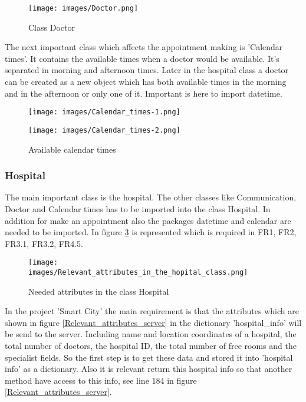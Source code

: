 \begin{figure}[H]
\centering
\sidecaption
\texttt{[image: images/Doctor.png]}
\caption{Class Doctor}
\label{Doctor}
\end{figure}

The next important class which affects the appointment making is 'Calendar times'. It contains the available times when a doctor would be available. It's separated in morning and afternoon times. Later in the hospital class a doctor can be created as a new object which has both available times in the morning and in the afternoon or only one of it. Important is here to import datetime.


\begin{figure}[t]
\begin{minipage}[t]{0.475\textwidth}
\centering
\texttt{[image: images/Calendar\_times-1.png]}
    \caption{Available calendar times}
    \label{Calendar_times}
\end{minipage}
\hfill
\begin{minipage}[t]{0.475\textwidth}
\centering
\texttt{[image: images/Calendar\_times-2.png]}
    \label{2}
\end{minipage}
\end{figure}

\subsubsection{Hospital}
The main important class is the hospital. The other classes like Communication, Doctor and Calendar times has to be imported into the class Hospital. In addition for make an appointment also the packages datetime and calendar are needed to be imported. In figure \ref{hospital_attributes} is represented which is required in FR1, FR2, FR3.1, FR3.2, FR4.5.

\begin{figure}[H]
\centering
\sidecaption
\texttt{[image: images/Relevant\_attributes\_in\_the\_hopital\_class.png]}
\caption{Needed attributes in the class Hospital}
\label{hospital_attributes}
\end{figure}


In the project 'Smart City' the main requirement is that the attributes which are shown in figure \ref{Relevant_attributes_server} in the dictionary 'hospital_info' will be send to the server. Including name and location coordinates of a hospital, the total number of doctors, the hospital ID, the total number of free rooms and the specialist fields. So the first step is to get these data and stored it into 'hospital info' as a dictionary. Also it is relevant return this hospital info so that another method have access to this info, see line 184 in figure \ref{Relevant_attributes_server}. 

